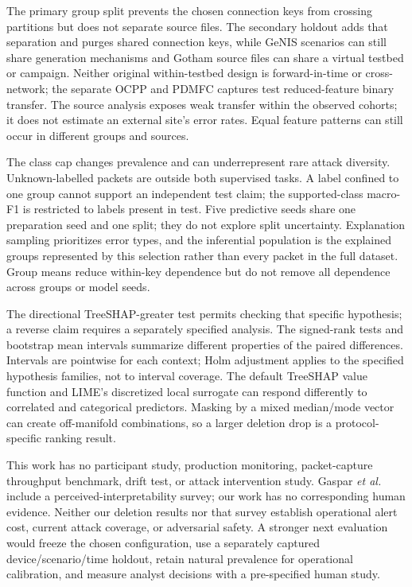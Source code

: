 \documentclass[journal,letterpaper]{IEEEtran}
\begin{document}
The primary group split prevents the chosen connection keys from crossing partitions but does not separate source files. The secondary holdout adds that separation and purges shared connection keys, while GeNIS scenarios can still share generation mechanisms and Gotham source files can share a virtual testbed or campaign. Neither original within-testbed design is forward-in-time or cross-network; the separate OCPP and PDMFC captures test reduced-feature binary transfer. The source analysis exposes weak transfer within the observed cohorts; it does not estimate an external site's error rates. Equal feature patterns can still occur in different groups and sources.

The class cap changes prevalence and can underrepresent rare attack diversity. Unknown-labelled packets are outside both supervised tasks. A label confined to one group cannot support an independent test claim; the supported-class macro-F1 is restricted to labels present in test. Five predictive seeds share one preparation seed and one split; they do not explore split uncertainty. Explanation sampling prioritizes error types, and the inferential population is the explained groups represented by this selection rather than every packet in the full dataset. Group means reduce within-key dependence but do not remove all dependence across groups or model seeds.

The directional TreeSHAP-greater test permits checking that specific hypothesis; a reverse claim requires a separately specified analysis. The signed-rank tests and bootstrap mean intervals summarize different properties of the paired differences. Intervals are pointwise for each context; Holm adjustment applies to the specified hypothesis families, not to interval coverage. The default TreeSHAP value function and LIME's discretized local surrogate can respond differently to correlated and categorical predictors. Masking by a mixed median/mode vector can create off-manifold combinations, so a larger deletion drop is a protocol-specific ranking result.

This work has no participant study, production monitoring, packet-capture throughput benchmark, drift test, or attack intervention study. Gaspar \emph{et al.} \cite{ref14} include a perceived-interpretability survey; our work has no corresponding human evidence. Neither our deletion results nor that survey establish operational alert cost, current attack coverage, or adversarial safety. A stronger next evaluation would freeze the chosen configuration, use a separately captured device/scenario/time holdout, retain natural prevalence for operational calibration, and measure analyst decisions with a pre-specified human study.
\end{document}
